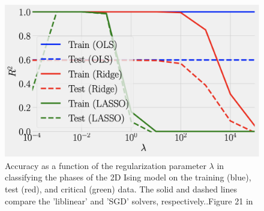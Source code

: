 \begin{figure}[H]
\includegraphics[width = 0.6\paperwidth]{figures/R2_article.png}
\caption{Accuracy as a function of the regularization parameter
\(\lambda\) in classifying the phases of the 2D Ising model on the
training (blue), test (red), and critical (green) data. The solid
and dashed lines compare the ’liblinear’ and ’SGD’ solvers, respectively..Figure 21 in ~\cite{HighBias}} 
\label{fig:logistic-article}
\end{figure}



